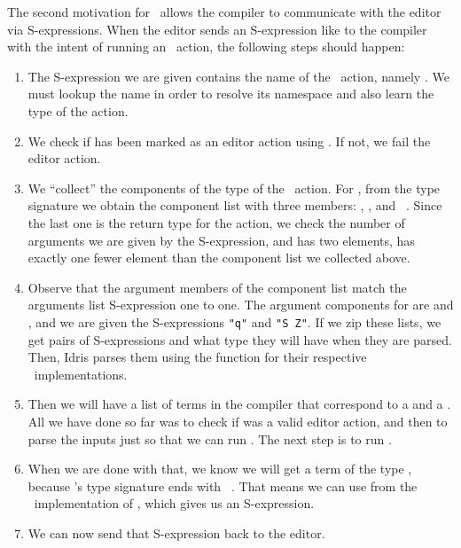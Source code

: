The second motivation for \Editorable\ allows the compiler to communicate with
the editor via S-expressions. When the editor sends an S-expression like
 to the
compiler with the intent of running an \Elab\ action,
the following steps should happen:
\begin{enumerate}
  \item The S-expression we are given contains the name of the \Elab\ action,
    namely . We must lookup the name in order to resolve its namespace
    and also learn the type of the action.
  \item We check if  has been marked as an editor action using
    . If not, we fail the editor action.
  \item We ``collect'' the components of the type of the \Elab\ action. For
    , from the type signature
    we obtain the component list with three members: , \TT, and
    \Elab\ \TT.
    Since the last one is the return type for the action, we check the number
    of arguments we are given by the S-expression, and 
    has two elements, has exactly one fewer element than the component list we
    collected above.
  \item Observe that the argument members of the component list match the
    arguments list S-expression one to one. The argument components for
     are  and \TT, and we are given the S-expressions
    \texttt{"q"} and \texttt{"S Z"}. If we zip these lists, we get pairs of
    S-expressions and what type they will have when they are parsed.
    Then, Idris parses them using the  function for their respective
    \Editorable\ implementations.
  \item Then we will have a list of terms in the compiler that correspond to a
     and a \TT.  All we have done so far was to check if 
    was a valid editor action, and then to parse the inputs just so that we can
    run . The next step is to run .
  \item When we are done with that, we know we will get a term of the type \TT,
    because 's type signature ends with \texttt{\Elab\ \TT}. That means
    we can use  from the \Editorable\ implementation of \TT, which
    gives us an S-expression.
  \item We can now send that S-expression back to the editor.
\end{enumerate}


